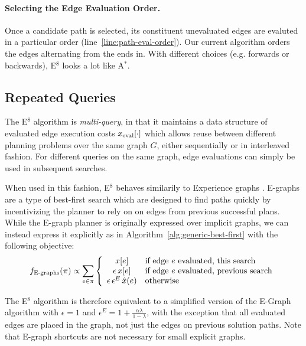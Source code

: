 \paragraph{Selecting the Edge Evaluation Order.}
\label{subsec:alg-path-evaluation}
Once a candidate path is selected,
its constituent unevaluated edges are evaluted
in a particular order (line~\ref{line:path-eval-order}).
Our current algorithm
orders the edges alternating from the ends in.
With different choices (e.g. forwards or backwards),
E$^8$ looks a lot like A$^*$.

\subsection{Repeated Queries}

The E$^8$ algorithm is \emph{multi-query},
in that it maintains a data structure of evaluated edge
execution costs $x_{\mbox{\scriptsize eval}}[\cdot]$
which allows reuse between different planning problems
over the same graph $G$,
either sequentially or in interleaved fashion.
For different queries on the same graph,
edge evaluations can simply be used in subsequent searches.

When used in this fashion,
E$^8$ behaves similarily to Experience graphs%
\cite{phillips2012egraphs}.
E-graphs are a type of best-first search which
are designed to find paths quickly by incentivizing the planner
to rely on on edges from previous successful plans.
While the E-graph planner is originally expressed over implicit graphs,
we can instead express it explicitly
as in Algorithm~\ref{alg:generic-best-first}
with the following objective:
\begin{equation}
   f_{\mbox{\scriptsize E-graphs}}(\pi) \propto \sum_{e \in \pi} \left\{
   \begin{array}{cl}
      x[e] & \mbox{if edge } e \mbox{ evaluated, this search} \\
      \epsilon \, x[e] & \mbox{if edge } e \mbox{ evaluated, previous search} \\
     \epsilon \, \epsilon^E \, \hat{x}(e) & \mbox{otherwise} \\
   \end{array}
   \right.
\end{equation}

The E$^8$ algorithm
is therefore equivalent to a simplified version of the E-Graph algorithm
with $\epsilon=1$ and $\epsilon^E = 1 + \frac{\alpha \lambda}{1-\lambda}$,
with the exception that all evaluated edges are placed in the graph,
not just the edges on previous solution paths.
Note that E-graph shortcuts
are not necessary for small explicit graphs.

